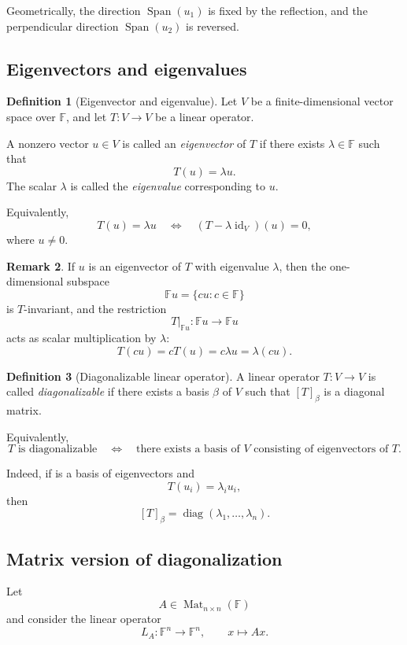 \documentclass[11pt]{article}
\newcommand{\F}{\mathbb F}
\newcommand{\Mat}{\operatorname{Mat}}
\newcommand{\id}{\operatorname{id}}
\newcommand{\Span}{\operatorname{Span}}
\newcommand{\diag}{\operatorname{diag}}
\theoremstyle{definition}
\newtheorem{definition}{Definition}[section]
\newtheorem{remark}[definition]{Remark}
\theoremstyle{plain}
\begin{document}
Geometrically, the direction $\Span(u_1)$ is fixed by the reflection, and the perpendicular direction $\Span(u_2)$ is reversed.

\subsection{Eigenvectors and eigenvalues}

\begin{definition}[Eigenvector and eigenvalue]
Let $V$ be a finite-dimensional vector space over $\F$, and let $T:V\to V$ be a linear operator.

A nonzero vector $u\in V$ is called an \emph{eigenvector} of $T$ if there exists $\lambda\in\F$ such that
\[
T(u)=\lambda u.
\]
The scalar $\lambda$ is called the \emph{eigenvalue} corresponding to $u$.
\end{definition}

Equivalently,
\[
T(u)=\lambda u
\quad\Longleftrightarrow\quad
(T-\lambda\id_V)(u)=0,
\]
where $u\neq 0$.

\begin{remark}
If $u$ is an eigenvector of $T$ with eigenvalue $\lambda$, then the one-dimensional subspace
\[
\F u=\{cu:c\in\F\}
\]
is $T$-invariant, and the restriction
\[
T|_{\F u}:\F u\to\F u
\]
acts as scalar multiplication by $\lambda$:
\[
T(cu)=cT(u)=c\lambda u=\lambda(cu).
\]
\end{remark}

\begin{definition}[Diagonalizable linear operator]
A linear operator $T:V\to V$ is called \emph{diagonalizable} if there exists a basis $\beta$ of $V$ such that $[T]_{\beta}$ is a diagonal matrix.
\end{definition}

Equivalently,
\[
T\text{ is diagonalizable}
\quad\Longleftrightarrow\quad
\text{there exists a basis of }V\text{ consisting of eigenvectors of }T.
\]

Indeed, if
is a basis of eigenvectors and
\[
T(u_i)=\lambda_i u_i,
\]
then
\[
[T]_{\beta}=\diag(\lambda_1,\dots,\lambda_n).
\]

\subsection{Matrix version of diagonalization}

Let
\[
A\in \Mat_{n\times n}(\F)
\]
and consider the linear operator
\[
L_A:\F^n\to\F^n,
\qquad
x\mapsto Ax.
\]
\end{document}
